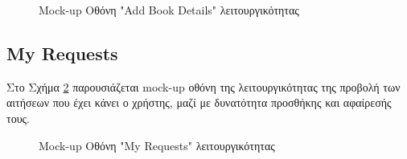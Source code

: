 \documentclass[12pt,a4paper]{article}
\begin{document}
\begin{figure}[H]
	\caption{Mock-up Οθόνη "Add Book Details" λειτουργικότητας}
	\label{Mock-up Οθόνη "Add Book Details" λειτουργικότητας}
\end{figure}


\subsection{My Requests}

Στο Σχήμα \ref{Mock-up Οθόνη "My Requests" λειτουργικότητας} παρουσιάζεται mock-up οθόνη της λειτουργικότητας της προβολή των αιτήσεων που έχει κάνει ο χρήστης, μαζί με δυνατότητα προσθήκης και αφαίρεσής τους.

\begin{figure}[H]
	\caption{Mock-up Οθόνη "My Requests" λειτουργικότητας}
	\label{Mock-up Οθόνη "My Requests" λειτουργικότητας}
\end{figure}
\end{document}
